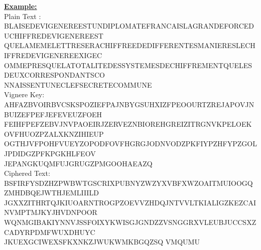\vspace{0.75cm}

\textbf{\underline{Example:}}\\[0.15cm]
Plain Text :\\[0.15cm]
BLAISEDEVIGENEREESTUNDIPLOMATEFRANCAISLAGRANDEFORCEDUCHIFFREDEVIGENEREEST\\
QUELAMEMELETTRESERACHIFFREEDEDIFFERENTESMANIERESLECHIFFREDEVIGENEREEXIGEC\\
OMMEPRESQUELATOTALITEDESSYSTEMESDECHIFFREMENTQUELESDEUXCORRESPONDANTSCO\\
NNAISSENTUNECLEFSECRETECOMMUNE\\[0.35cm]
Vignere Key: \\[0.15cm]
AHFAZBVOIRBVCSKSPOZIEFPAJNBYGSUHXIZFPEOOURTZREJAPOVJNBUIZEFPEFJEFEVEUZFOEH\\
FEIHFPEFZEBVJNVPAOEIRJZERVEZNBIOREHGREIZITRGNVKPELOEKOVFHUOZPZALXKNZIHIEUP\\
OGTHJVFPOHFVUEYZOPODFOVFHGRGJODNVODZPKFIYPZHFYPZGOLJPDIDGZPFKPGKHLFEOV\\JEPANGKUQMFUJGRUGZPMGOOHAEAZQ
\\[0.35cm]

Ciphered Text:\\[0.15cm]
BSFIRFYSDZHZPWBWTGSCRIXPUBNYZWZYXVBFXWZOAITMUIOOGQZMHDBQEJWTHJEMLIIILD\\
JGXXZITHRTQJKIUOARNTROGPZOEVVZHDQJNTVVLTKIALIGZKEZCAINVMPTMJKYJHVDNPOOR\\
WQNMGIBAKIYNNVJSSFOIXYKWISGJGNDZZVSNGGRXVLEUBJUCCSXZCADYRPDMFWUXDHUYC\\JKUEXGCIWEXSFKXNKZJWUKWMKBGQZSQ
VMQUMU

\newpage
